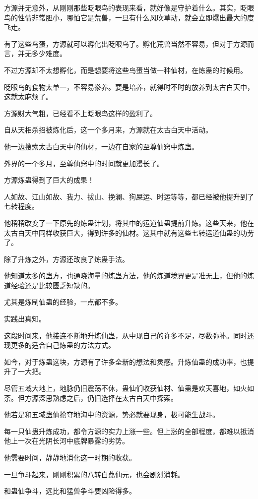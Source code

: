 \begin{this_body}
方源并无意外，从刚刚那些眨眼鸟的表现来看，就好像是守护着什么。其实，眨眼鸟的性情非常胆小，哪怕它是荒兽，一旦有什么风吹草动，就会立即爆出最大的度飞走。

有了这些鸟蛋，方源就可以孵化出眨眼鸟了。孵化荒兽当然不容易，但对于方源而言，并无多少难度。

不过方源却不太想孵化，而是想要将这些鸟蛋当做一种仙材，在炼蛊的时候用。

眨眼鸟的食物太单一，不容易豢养。要是培养，就得时不时的放养到太古白天中，这就太麻烦了。

方源财大气粗，已经看不上眨眼鸟这样的盈利了。

自从天相杀招被炼化后，这一个多月来，方源就在太古白天中活动。

他一边搜索太古白天中的仙材，一边在自家的至尊仙窍中炼蛊。

外界的一个多月，至尊仙窍中的时间就更加漫长了。

方源炼蛊得到了巨大的成果！

人如故、江山如故、我力、拔山、挽澜、狗屎运、时运等等，都已经被他提升到了七转程度。

他稍稍改变了一下原先的炼蛊计划，将其中的运道仙蛊提前升炼。这些天来，他在太古白天中同样收获巨大，得到许多的仙材。这其中就有这些七转运道仙蛊的功劳了。

除了升炼之外，方源还改良了炼蛊手法。

他知道太多的蛊方，也通晓海量的炼蛊方法，他的炼道境界更是准无上，但他的炼道经验还是比较匮乏短缺的。

尤其是炼制仙蛊的经验，一点都不多。

实践出真知。

这段时间来，他接连不断地升炼仙蛊，从中现自己的许多不足，尽数弥补。同时还现更多的适合自己炼蛊的方法方式。

如今，对于炼蛊这块，方源有了许多全新的想法和灵感。升炼仙蛊的成功率，也提升了一大把。

尽管五域大地上，地脉仍旧震荡不休，蛊仙们收获仙材、仙蛊是欢天喜地，如火如荼。但方源深思熟虑之后，仍旧选择在太古白天中探索。

他若是和五域蛊仙抢夺地沟中的资源，势必就要现身，极可能生战斗。

每一只仙蛊升炼成功，都令方源的实力上涨一些。但上涨的全部程度，都难以抵消他上一次在光阴长河中底牌暴露的劣势。

他需要时间，静静地消化这一时期的收获。

一旦争斗起来，刚刚积累的八转白荔仙元，也会剧烈消耗。

和蛊仙争斗，远比和猛兽争斗要凶险得多。


\end{this_body}
